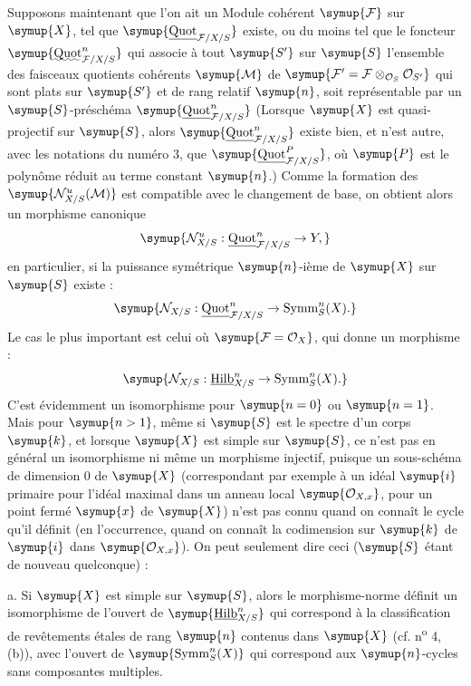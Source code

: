 Supposons maintenant que l'on ait un Module cohérent $\symup{\mathcal F}$ sur $\symup{X}$, tel
que $\symup{\underline{\operatorname{Quot}}_{\mathcal F/X/S}}$ existe, ou du moins tel que le
foncteur $\symup{\mathop{\text{\uwave{Quot}}}\nolimits^n_{\mathcal F/X/S}}$ qui associe à
tout $\symup{S'}$ sur $\symup{S}$ l'ensemble des faisceaux quotients cohérents $\symup{\mathcal M}$ de
$\symup{\mathcal F'=\mathcal F\otimes_{\mathcal O_S}\mathcal O_{S'}}$ qui sont plats
sur $\symup{S'}$ et de rang relatif $\symup{n}$, soit représentable par un $\symup{S}$-préschéma
$\symup{\underline{\operatorname{Quot}}^n_{\mathcal F/X/S}}$ (Lorsque $\symup{X}$ est quasi-projectif sur
$\symup{S}$, alors $\symup{\underline{\operatorname{Quot}}^n_{\mathcal F/X/S}}$ existe bien, et n'est
autre, avec les notations du numéro 3, que
$\symup{\underline{\operatorname{Quot}}^P_{\mathcal F/X/S}}$, où $\symup{P}$ est le polynôme réduit au
terme constant $\symup{n}$.) Comme la formation des $\symup{\mathcal N^u_{X/S}(\mathcal M)}$ est
compatible avec le changement de base, on obtient alors un morphisme canonique
\[
\symup{\mathcal N^u_{X/S}:\underline{\operatorname{Quot}}^n_{\mathcal F/X/S}\to Y,}
\]
en particulier, si la puissance symétrique $\symup{n}$-ième de $\symup{X}$ sur $\symup{S}$ existe :
\[
\symup{\mathcal N_{X/S}:\underline{\operatorname{Quot}}^n_{\mathcal F/X/S}\to\operatorname{Symm}^n_S(X).}
\]
Le cas le plus important est celui où $\symup{\mathcal F=\mathcal O_X}$, qui donne un morphisme :
\[
\symup{\mathcal N_{X/S}:\underline{\operatorname{Hilb}}^n_{X/S}
\to\operatorname{Symm}^n_S(X).}
\]
C'est évidemment un isomorphisme pour $\symup{n=0}$ ou $\symup{n=1}$. Mais pour
$\symup{n>1}$, même
si $\symup{S}$ est le spectre d'un corps $\symup{k}$, et lorsque $\symup{X}$ est simple sur $\symup{S}$, ce
n'est pas en général un isomorphisme ni même un morphisme injectif, puisque un
sous-schéma de dimension 0 de $\symup{X}$ (correspondant par exemple à un idéal
$\symup{i}$ primaire pour l'idéal maximal dans un anneau local
$\symup{\mathcal O_{X,x}}$, pour un point fermé $\symup{x}$ de $\symup{X}$) n'est pas connu quand on
connaît le cycle qu'il définit (en l'occurrence, quand on connaît la codimension
sur $\symup{k}$ de $\symup{i}$ dans $\symup{\mathcal O_{X,x}}$). On peut seulement dire ceci
($\symup{S}$ étant de nouveau quelconque) :

\medskip
\noindent a. Si $\symup{X}$ est simple sur $\symup{S}$, alors le morphisme-norme définit un
isomorphisme de l'ouvert de $\symup{\underline{\operatorname{Hilb}}^n_{X/S}}$ qui correspond à la
classification de revêtements étales de rang $\symup{n}$ contenus dans $\symup{X}$ (cf.
n\textsuperscript{o} 4, (b)), avec l'ouvert de
$\symup{\operatorname{Symm}^n_S(X)}$ qui correspond aux $\symup{n}$-cycles sans composantes
multiples.

